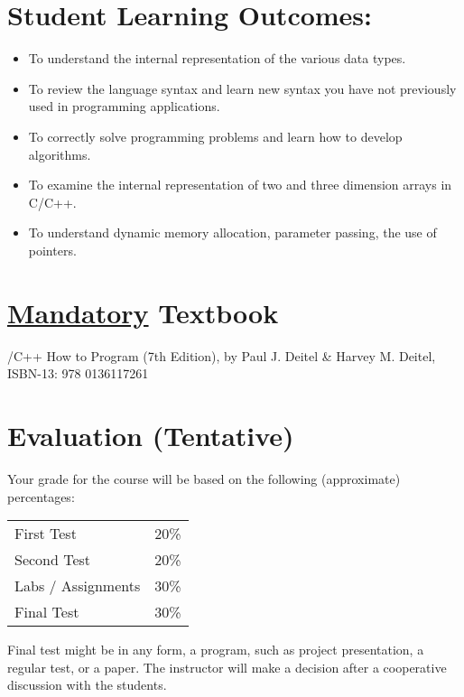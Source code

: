 \documentclass[11pt]{article}
\begin{document}
\section*{Student Learning Outcomes:}
\label{sec-4}


\begin{itemize}
\item To understand the internal representation of the various data types.
\item To review the language syntax and learn new syntax you have not previously used in programming applications.
\item To correctly solve programming problems and learn how to develop algorithms.
\item To examine the internal representation of two and three dimension arrays in C/C++.
\item To understand dynamic memory allocation, parameter passing, the use of pointers.
\end{itemize}
\section*{\underline{Mandatory} Textbook}
\label{sec-5}

/C++ How to Program (7th Edition), by Paul J. Deitel \& Harvey M. Deitel, ISBN-13: 978 0136117261
\section*{Evaluation (Tentative)}
\label{sec-6}

Your grade for the course will be based on the following (approximate) percentages:


\begin{center}
\begin{tabular*}{0.9\textwidth}{ll}
 First Test          &  20\%  \\
 Second Test         &  20\%  \\
 Labs / Assignments  &  30\%  \\
 Final Test          &  30\%  \\
\end{tabular*}
\end{center}



Final test might be in any form, a program, such as project
presentation, a regular test, or a paper. The instructor will make a
decision after a cooperative discussion with the students.
\end{document}
